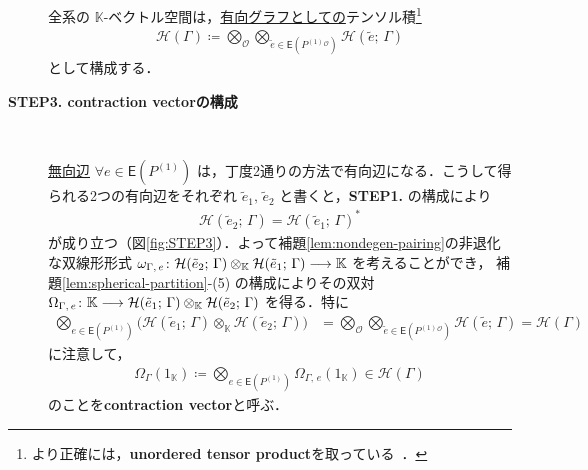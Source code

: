 \documentclass[TQFT_main]{subfiles}
\begin{document}
\begin{description}
    全系の $\mathbb{K}$-ベクトル空間は，\underline{有向グラフとしての}テンソル積\footnote{より正確には，\textbf{unordered tensor product}を取っている~\cite[Appendix E, p.477]{Turaev2017}．}
    \begin{align}
        \mathcal{H}(\Gamma) \coloneqq \bigotimes_{\mathcal{O}} \bigotimes_{\tilde{e} \in \mathsf{E}(P^{(1)}{}^{\mathcal{O}})} \mathcal{H} (\tilde{e};\, \Gamma)
    \end{align}
    として構成する．

    \item[\textbf{STEP3. contraction vectorの構成}]　
    \label{TV:STEP3}
    
    \underline{無向辺} $\forall e \in \mathsf{E}(P^{(1)})$ は，丁度2通りの方法で有向辺になる．こうして得られる2つの有向辺をそれぞれ $\tilde{e}_1,\, \tilde{e}_2$ と書くと，\textsf{\textbf{STEP1.}} の構成により
    \begin{align}
        \mathcal{H} (\tilde{e}_2;\, \Gamma) = \mathcal{H} (\tilde{e}_1;\, \Gamma)^*
    \end{align}
    が成り立つ（図\ref{fig:STEP3}）．よって補題\ref{lem:nondegen-pairing}の非退化な双線形形式 $\omega_{\Gamma,\, e} \colon \mathcal{H} (\tilde{e}_2;\, \Gamma) \otimes_{\mathbb{K}} \mathcal{H} (\tilde{e}_1;\, \Gamma) \longrightarrow \mathbb{K}$ を考えることができ，
    補題\ref{lem:spherical-partition}-(5) の構成によりその双対 $\Omega_{\Gamma,\, e} \colon \mathbb{K} \longrightarrow \mathcal{H} (\tilde{e}_1;\, \Gamma) \otimes_{\mathbb{K}} \mathcal{H} (\tilde{e}_2;\, \Gamma)$ を得る．特に
    \begin{align}
        \bigotimes_{e \in \mathsf{E}(P^{(1)})} \bigl( \mathcal{H} (\tilde{e}_1;\, \Gamma) \otimes_{\mathbb{K}} \mathcal{H} (\tilde{e}_2;\, \Gamma)\bigr)
        &= \bigotimes_{\mathcal{O}} \bigotimes_{\tilde{e} \in \mathsf{E}(P^{(1)}{}^{\mathcal{O}})} \mathcal{H} (\tilde{e};\, \Gamma) = \mathcal{H}(\Gamma)
    \end{align}
    に注意して，
    \begin{align}
        \label{eq:contraction}
        \Omega_\Gamma(1_{\mathbb{K}}) \coloneqq \bigotimes_{e \in \mathsf{E}(P^{(1)})} \Omega_{\Gamma,\, e} (1_{\mathbb{K}}) \in \mathcal{H}(\Gamma)
    \end{align}
    のことを\textbf{contraction vector}と呼ぶ．

    \begin{figure}[H]
        \centering
\end{figure}
\end{description}
\end{document}
